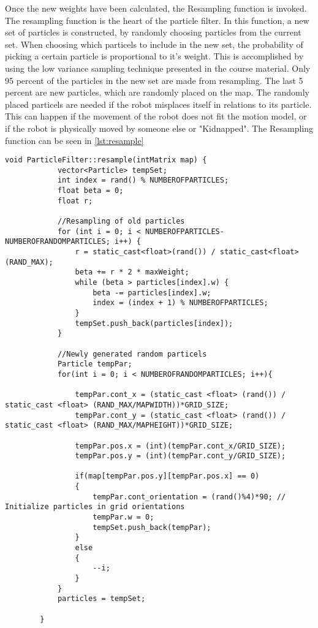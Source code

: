 \documentclass[Main]{subfiles}
\begin{document}
	
	Once the new weights have been calculated, the Resampling function is invoked. 
	The resampling function is the heart of the particle filter.
	In this function, a new set of particles is constructed, by randomly choosing particles from the current set.
	When choosing which particels to include in the new set, the probability of picking a certain particle is proportional to it's weight.
	This is accomplished by using the low variance sampling technique presented in the course material.
	Only 95 percent of the particles in the new set are made from resampling.
	The last 5 percent are new particles, which are randomly placed on the map.
	The randomly placed particels are needed if the robot misplaces itself in relations to its particle.
	This can happen if the movement of the robot does not fit the motion model, or if the robot is physically moved by someone else or "Kidnapped". 
	The Resampling function can be seen in \autoref{lst:resample}
	
	\begin{lstlisting}[caption=Resampling function of ParticleFilter, style=Code-C++, label=lst:resample, basicstyle=\scriptsize]
		void ParticleFilter::resample(intMatrix map) {
			vector<Particle> tempSet;
			int index = rand() % NUMBEROFPARTICLES;
			float beta = 0;
			float r;
		
			//Resampling of old particles
			for (int i = 0; i < NUMBEROFPARTICLES-NUMBEROFRANDOMPARTICLES; i++) {
				r = static_cast<float>(rand()) / static_cast<float>(RAND_MAX);
				beta += r * 2 * maxWeight;
				while (beta > particles[index].w) {
					beta -= particles[index].w;
					index = (index + 1) % NUMBEROFPARTICLES;
				}
				tempSet.push_back(particles[index]);
			}
		
			//Newly generated random particels
			Particle tempPar;
			for(int i = 0; i < NUMBEROFRANDOMPARTICLES; i++){
		
				tempPar.cont_x = (static_cast <float> (rand()) / static_cast <float> (RAND_MAX/MAPWIDTH))*GRID_SIZE;
				tempPar.cont_y = (static_cast <float> (rand()) / static_cast <float> (RAND_MAX/MAPHEIGHT))*GRID_SIZE;
	
				tempPar.pos.x = (int)(tempPar.cont_x/GRID_SIZE);
				tempPar.pos.y = (int)(tempPar.cont_y/GRID_SIZE);
		
				if(map[tempPar.pos.y][tempPar.pos.x] == 0)
				{
					tempPar.cont_orientation = (rand()%4)*90; // Initialize particles in grid orientations
					tempPar.w = 0;
					tempSet.push_back(tempPar);
				}
				else
				{
					--i;
				}
			}
			particles = tempSet;
	
		}	
	\end{lstlisting}
\end{document}
